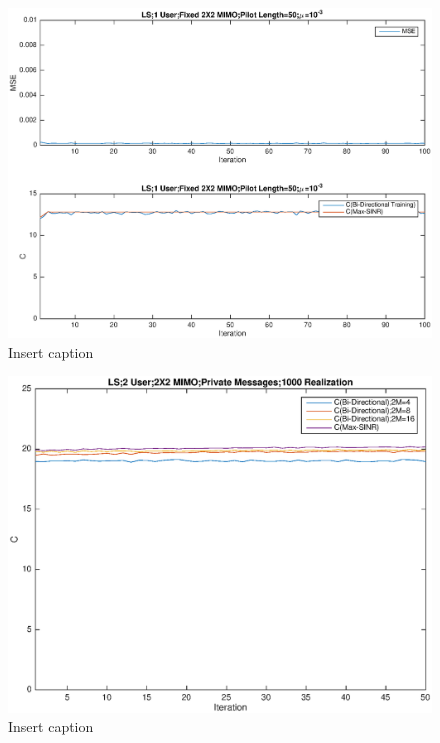 \documentclass[11pt, oneside]{article}   	%
\begin{document}
\begin{figure}[bp!]
    \centering
    \centerline{\includegraphics[width=220mm]{LS1}}
    \caption{Insert caption}
\end{figure} 

\begin{figure}[bp!]
    \centering
    \centerline{\includegraphics[width=220mm]{only_private}}
    \caption{Insert caption}
\end{figure} 
\end{document}
